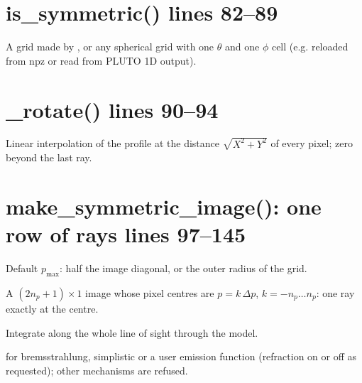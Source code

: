 \section*{\normalsize is\_symmetric() \hfill{\small\mdseries\color{gray}lines 82--89}}

A grid made by , or any spherical grid with one $\theta$ and one $\phi$ cell (e.g. reloaded from npz or read from PLUTO 1D output).

\section*{\normalsize \_rotate() \hfill{\small\mdseries\color{gray}lines 90--94}}

Linear interpolation of the profile at the distance $\sqrt{X^2+Y^2}$ of every pixel; zero beyond the last ray.

\section*{\normalsize make\_symmetric\_image(): one row of rays \hfill{\small\mdseries\color{gray}lines 97--145}}

\begin{lines}
\item[L.122–126] Default $p_\text{max}$: half the image diagonal, or the outer radius of the grid.
\item[L.131–132] A $(2n_p+1)\times1$ image whose pixel centres are $p=k\,\Delta p$, $k=-n_p\ldots n_p$: one ray exactly at the centre.
\item[L.136] Integrate along the whole line of sight through the model.
\item[L.140–145]  for bremsstrahlung, simplistic or a user emission function (refraction on or off as requested); other mechanisms are refused.
\end{lines}
